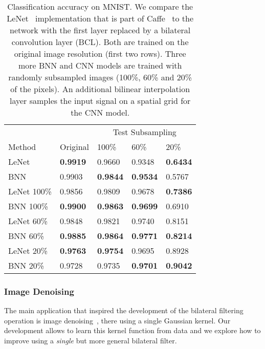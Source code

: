 \begin{table}[t]
  \begin{center}
    \footnotesize
    \centering
    \begin{tabular}[t]{lllll}
      \toprule
              &     & \multicolumn{3}{c}{Test Subsampling} \\
       Method  & Original & 100\% & 60\% & 20\%\\
      \midrule
       LeNet &  \textbf{0.9919} & 0.9660 & 0.9348 & \textbf{0.6434} \\
       BNN &  0.9903 & \textbf{0.9844} & \textbf{0.9534} & 0.5767 \\
      \hline
       LeNet 100\% & 0.9856 & 0.9809 & 0.9678 & \textbf{0.7386} \\
       BNN 100\% & \textbf{0.9900} & \textbf{0.9863} & \textbf{0.9699} & 0.6910 \\
      \hline
       LeNet 60\% & 0.9848 & 0.9821 & 0.9740 & 0.8151 \\
       BNN 60\% & \textbf{0.9885} & \textbf{0.9864} & \textbf{0.9771} & \textbf{0.8214}\\
      \hline
       LeNet 20\% & \textbf{0.9763} & \textbf{0.9754} & 0.9695 & 0.8928 \\
       BNN 20\% & 0.9728 & 0.9735 & \textbf{0.9701} & \textbf{0.9042}\\
      \bottomrule
    \end{tabular}
  \end{center}
\vspace{-.2cm}
\caption{Classification accuracy on MNIST. We compare the
    LeNet~\cite{lecun1998gradient} implementation that is part of
    Caffe~\cite{jia2014caffe} to the network with the first layer
    replaced by a bilateral convolution layer (BCL). Both are trained
    on the original image resolution (first two rows). Three more BNN
    and CNN models are trained with randomly subsampled images (100\%,
    60\% and 20\% of the pixels). An additional bilinear interpolation
    layer samples the input signal on a spatial grid for the CNN model.
  }
  \label{tab:all-results}
\vspace{-.5cm}
\end{table}

\subsubsection{Image Denoising}

The main application that inspired the development of the bilateral
filtering operation is image denoising~\cite{aurich1995non}, there
using a single Gaussian kernel. Our development allows to learn this
kernel function from data and we explore how to improve using a \emph{single}
but more general bilateral filter.

